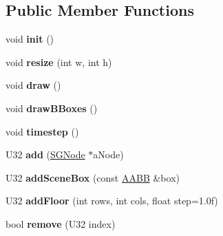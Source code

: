 \subsection*{Public Member Functions}
\begin{DoxyCompactItemize}
\item 
\hypertarget{classps_1_1scene_1_1SGEngine_a74eaee413e40470ba1e9bddedbfbc36c}{}void {\bfseries init} ()\label{classps_1_1scene_1_1SGEngine_a74eaee413e40470ba1e9bddedbfbc36c}

\item 
\hypertarget{classps_1_1scene_1_1SGEngine_ae4293eb87305b949db9cbbd09016d70f}{}void {\bfseries resize} (int w, int h)\label{classps_1_1scene_1_1SGEngine_ae4293eb87305b949db9cbbd09016d70f}

\item 
\hypertarget{classps_1_1scene_1_1SGEngine_a4a132d305999a5839af002611e30f2e5}{}void {\bfseries draw} ()\label{classps_1_1scene_1_1SGEngine_a4a132d305999a5839af002611e30f2e5}

\item 
\hypertarget{classps_1_1scene_1_1SGEngine_a570302efb3898600192d840ef90cbba4}{}void {\bfseries draw\+B\+Boxes} ()\label{classps_1_1scene_1_1SGEngine_a570302efb3898600192d840ef90cbba4}

\item 
\hypertarget{classps_1_1scene_1_1SGEngine_aafacce8f51ee18fb076f4b94a59488ed}{}void {\bfseries timestep} ()\label{classps_1_1scene_1_1SGEngine_aafacce8f51ee18fb076f4b94a59488ed}

\item 
\hypertarget{classps_1_1scene_1_1SGEngine_a504bbcd141b9f0fc3a474a4a27a75513}{}U32 {\bfseries add} (\hyperlink{classps_1_1scene_1_1SGNode}{S\+G\+Node} $\ast$a\+Node)\label{classps_1_1scene_1_1SGEngine_a504bbcd141b9f0fc3a474a4a27a75513}

\item 
\hypertarget{classps_1_1scene_1_1SGEngine_a66a380aa8a4534840ff2eb5da624d88f}{}U32 {\bfseries add\+Scene\+Box} (const \hyperlink{classps_1_1base_1_1AABB}{A\+A\+B\+B} \&box)\label{classps_1_1scene_1_1SGEngine_a66a380aa8a4534840ff2eb5da624d88f}

\item 
\hypertarget{classps_1_1scene_1_1SGEngine_aeba8022ce1742e97bfca50ce6d72198a}{}U32 {\bfseries add\+Floor} (int rows, int cols, float step=1.\+0f)\label{classps_1_1scene_1_1SGEngine_aeba8022ce1742e97bfca50ce6d72198a}

\item 
\hypertarget{classps_1_1scene_1_1SGEngine_a4d2fbb40e014948ebb223b8d7501f5e3}{}bool {\bfseries remove} (U32 index)\label{classps_1_1scene_1_1SGEngine_a4d2fbb40e014948ebb223b8d7501f5e3}


\end{DoxyCompactItemize}
